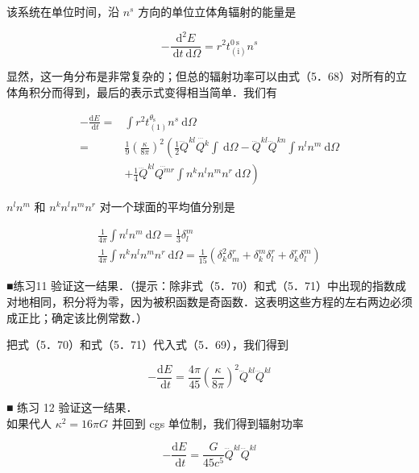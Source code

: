 该系统在单位时间，沿 $n^{s}$ 方向的单位立体角辐射的能量是


\begin{equation*}
	-\frac{\mathrm{d}^{2} E}{\mathrm{~d} t \mathrm{~d} \Omega}=r^{2} t_{(\mathrm{i})}^{0 \mathrm{~s}} n^{s} \tag{5.68}
\end{equation*}


显然，这一角分布是非常复杂的；但总的辐射功率可以由式（5．68）对所有的立体角积分而得到，最后的表示式变得相当简单．我们有


\begin{align*}
	-\frac{\mathrm{d} E}{\mathrm{~d} t}= & \int r^{2} t_{(1)}^{\theta_{\mathrm{s}}} n^{s} \mathrm{~d} \Omega \\
	= & \frac{1}{9}\left(\frac{\kappa}{8 \pi}\right)^{2}\left(\frac{1}{2} \dddot{Q}^{k l} \dddot{Q^{k}} \int \mathrm{~d} \Omega-\dddot{Q}^{k l} \dddot{Q}^{k n} \int n^{l} n^{m} \mathrm{~d} \Omega\right. \\
	& \left.+\frac{1}{4} \dddot{Q}^{k l} \dddot{Q^{m r}} \int n^{k} n^{l} n^{m} n^{r} \mathrm{~d} \Omega\right) \tag{5.69}
\end{align*}


$n^{l} n^{m}$ 和 $n^{k} n^{l} n^{m} n^{r}$ 对一个球面的平均值分别是


\begin{gather*}
	\frac{1}{4 \pi} \int n^{l} n^{m} \mathrm{~d} \Omega=\frac{1}{3} \delta_{l}^{m}  \tag{5.70}\\
	\frac{1}{4 \pi} \int n^{k} n^{l} n^{m} n^{r} \mathrm{~d} \Omega=\frac{1}{15}\left(\delta_{k}^{2} \delta_{m}^{r}+\delta_{k}^{m} \delta_{l}^{r}+\delta_{k}^{r} \delta_{l}^{m}\right) \tag{5.71}
\end{gather*}


■练习11 验证这一结果．（提示：除非式（5．70）和式（5．71）中出现的指数成对地相同，积分将为零，因为被积函数是奇函数．这表明这些方程的左右两边必须成正比；确定该比例常数．）

把式（5．70）和式（5．71）代入式（5．69），我们得到


\begin{equation*}
	-\frac{\mathrm{d} E}{\mathrm{~d} t}=\frac{4 \pi}{45}\left(\frac{\kappa}{8 \pi}\right)^{2} \dddot{Q}^{k l} \dddot{Q}^{k l} \tag{5.72}
\end{equation*}


■ 练习 12 验证这一结果．\\
如果代人 $\kappa^{2}=16 \pi G$ 并回到 cgs 单位制，我们得到辐射功率


\begin{equation*}
	-\frac{\mathrm{d} E}{\mathrm{~d} t}=\frac{G}{45 c^{5}} \dddot{Q}^{k l} \dddot{Q}^{k l} \tag{5.73}
\end{equation*}


